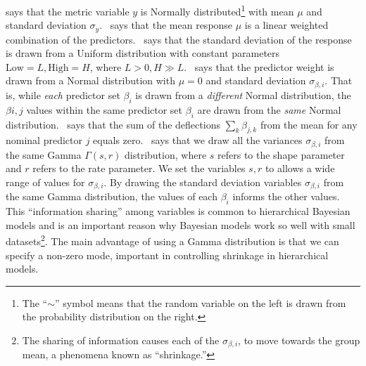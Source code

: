  says that the metric variable $y$ is Normally distributed\footnote{The ``$\sim$'' symbol means that the random variable on the left is drawn from the probability distribution on the right.} with mean $\mu$ and standard deviation $\sigma_y$.~ says that the mean response $\mu$ is a linear weighted combination of the predictors.~ says that the standard deviation of the response is drawn from a Uniform distribution with constant parameters $\text{Low}=L, \text{High}=H$, where $L>0, H\gg L$.~ says that the predictor weight is drawn from a Normal distribution with $\mu=0$ and standard deviation $\sigma_{\beta, i}$. That is,  while \textit{each} predictor set $\beta_{i}$ is drawn from a \textit{different} Normal distribution, the $\beta{i,j}$ values within the same predictor set $\beta_{i}$ are drawn from the \textit{same} Normal distribution.~ says that the sum of the deflections $\sum_k \beta_{j,k}$ from the mean for any nominal predictor $j$ equals zero.~ says that we draw all the variances $\sigma_{\beta, i}$ from the same Gamma $\Gamma(s,r)$ distribution, where $s$ refers to the shape parameter and $r$ refers to the rate parameter. We set the variables $s,r$ to allows a wide range of values for $\sigma_{\beta, i}$. By drawing the standard deviation variables $\sigma_{\beta, i}$ from the same Gamma distribution, the values of each $\beta_i$ informs the other values. This ``information sharing'' among variables is common to hierarchical Bayesian models and is an important reason why Bayesian models work so well with small datasets\footnote{The sharing of information causes each of the $\sigma_{\beta, i}$, to move towards the group mean, a phenomena known as ``shrinkage.'' }. The main advantage of using a Gamma distribution is that we can specify a non-zero mode, important in controlling shrinkage in hierarchical models.

